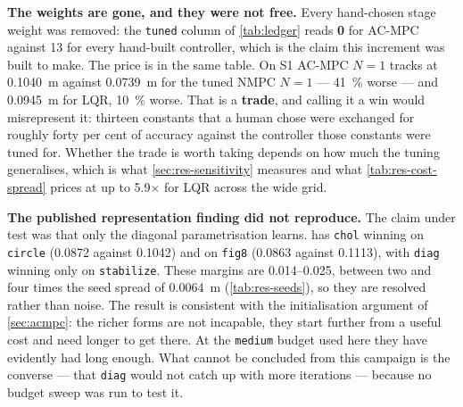 \documentclass[11pt,a4paper,twoside,openright]{report}
\makeatletter
\renewcommand{\subsection}{\FloatBarrier\old@subsection}}
\DeclareRobustCommand{\ACMPC}{AC\nbd MPC}
\theoremstyle{plain}
\theoremstyle{definition}
\theoremstyle{remark}
\DeclareRobustCommand{\nbd}{\mbox{-}}
\makeatother
\begin{document}
	\subsection{Analysis}

	\textbf{The weights are gone, and they were not free.} Every hand-chosen
	stage weight was removed: the \texttt{tuned} column of \cref{tab:ledger}
	reads \textbf{0} for \ACMPC{} against \num{13} for every hand-built
	controller, which is the claim this increment was built to make. The price
	is in the same table. On S1 \ACMPC{} $N{=}1$ tracks at \SI{0.1040}{\metre}
	against \SI{0.0739}{\metre} for the tuned NMPC $N{=}1$ --- \SI{41}{\percent}
	worse --- and \SI{0.0945}{\metre} for LQR, \SI{10}{\percent} worse. That is
	a \textbf{trade}, and calling it a win would misrepresent it: thirteen
	constants that a human chose were exchanged for roughly forty per cent of
	accuracy against the controller those constants were tuned for. Whether the
	trade is worth taking depends on how much the tuning generalises, which is
	what \cref{sec:res-sensitivity} measures and what \cref{tab:res-cost-spread}
	prices at up to \num{5.9}$\times$ for LQR across the wide grid.

	\textbf{The published representation finding did not reproduce.} The claim
	under test was that only the diagonal parametrisation learns.
	 has \texttt{chol} winning on \texttt{circle}
	(\num{0.0872} against \num{0.1042}) and on \texttt{fig8} (\num{0.0863}
	against \num{0.1113}), with \texttt{diag} winning only on
	\texttt{stabilize}. These margins are \numrange{0.014}{0.025}, between two
	and four times the seed spread of \SI{0.0064}{\metre}
	(\cref{tab:res-seeds}), so they are resolved rather than noise. The result
	is consistent with the initialisation argument of \cref{sec:acmpc}: the
	richer forms are not incapable, they start further from a useful cost and
	need longer to get there. At the \texttt{medium} budget used here they have
	evidently had long enough. What cannot be concluded from this campaign is
	the converse --- that \texttt{diag} would not catch up with more iterations
	--- because no budget sweep was run to test it.
\end{document}
